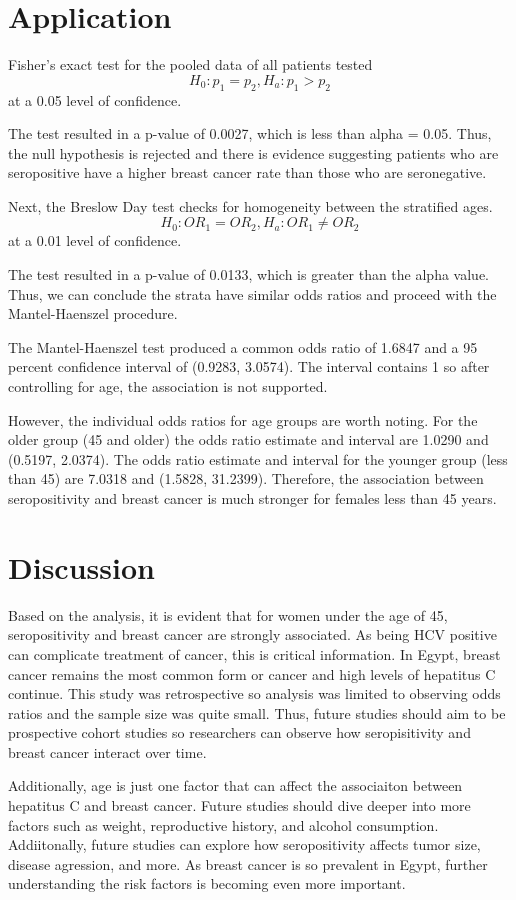\documentclass[12pt, titlepage]{article}
\begin{document}
\section{Application}
\label{sec:app}
Fisher's exact test for the pooled data of all patients tested 
\[
H_{0}:p_{1}=p_{2}, H_{a}:p_{1}>p_{2}
\]
at a 0.05 level of confidence.

The test resulted in a p-value of 0.0027, which is less than 
alpha = 0.05. Thus, the null hypothesis is rejected and there 
is evidence suggesting patients who are seropositive have a
higher breast cancer rate than those who are seronegative.

Next, the Breslow Day test checks for homogeneity between the 
stratified ages. 
\[
H_{0}:OR_{1}=OR_{2}, H_{a}:OR_{1}\neq{OR_{2}}
\]
at a 0.01 level of confidence. 

The test resulted in a p-value of 0.0133, which is greater than
the alpha value. Thus, we can conclude the strata have similar
odds ratios and proceed with the Mantel-Haenszel procedure. 

The Mantel-Haenszel test produced a common odds ratio of 1.6847 and 
a 95 percent confidence interval of (0.9283, 3.0574). The interval
contains 1 so after controlling for age, the association is not supported.

However, the individual odds ratios for age groups are worth noting. For 
the older group (45 and older) the odds ratio estimate and interval are 
1.0290 and (0.5197, 2.0374). The odds ratio estimate and interval for the 
younger group (less than 45) are 7.0318 and (1.5828, 31.2399). Therefore,
the association between seropositivity and breast cancer is much stronger
for females less than 45 years. 

\section{Discussion}
\label{sec:discuss}
  Based on the analysis, it is evident that for women under the age of 45,
seropositivity and breast cancer are strongly associated. As being HCV 
positive can complicate treatment of cancer, this is critical information.
In Egypt, breast cancer remains the most common form or cancer and high 
levels of hepatitus C continue. This study was retrospective so analysis 
was limited to observing odds ratios and the sample size was quite small.
Thus, future studies should aim to be prospective cohort studies so 
researchers can observe how seropisitivity and breast cancer interact 
over time. 

Additionally, age is just one factor that can affect the associaiton 
between hepatitus C and breast cancer. Future studies should dive 
deeper into more factors such as weight, reproductive history, 
and alcohol consumption. Addiitonally, future studies can explore how 
seropositivity affects tumor size, disease agression, and more. As 
breast cancer is so prevalent in Egypt, further understanding the 
risk factors is becoming even more important. 

\pagebreak



\end{document}

